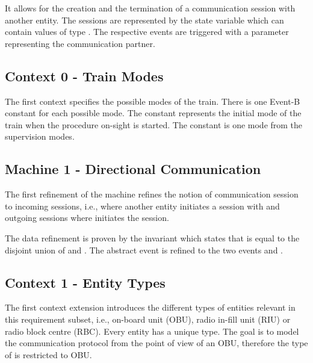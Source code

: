 \documentclass{template/openetcs_article}
\begin{document}
It allows for the creation and the termination of a communication session with
another entity. The sessions are represented by the state variable
 which can contain values of type . The respective
events are triggered with a parameter  representing the
communication partner.


\subsection{Context 0 - Train Modes}
\label{sec:context-0-entities}

The first context  specifies the possible modes of the train. There is
one Event-B constant for each possible mode. The constant
 represents the initial mode of the train when the
procedure on-sight is started. The constant  is one
mode from the supervision modes.




\subsection{Machine 1 - Directional Communication}
\label{sec:mach-1-direct}

The first refinement of the machine refines the notion of communication session
to incoming sessions, i.e., where another entity initiates a session with
 and outgoing sessions where  initiates the
session.

The data refinement is proven by the invariant which states that 
is equal to the disjoint union of  and
. The abstract  event is
refined to the two events  and .

%

\subsection{Context 1 - Entity Types}
\label{sec:context-1-entity}

The first context extension introduces the different types of entities relevant
in this requirement subset, i.e., on-board unit (OBU), radio in-fill unit (RIU)
or radio block centre (RBC). Every entity has a unique type. The goal is to
model the communication protocol from the point of view of an OBU, therefore the
type of  is restricted to OBU.
\end{document}
